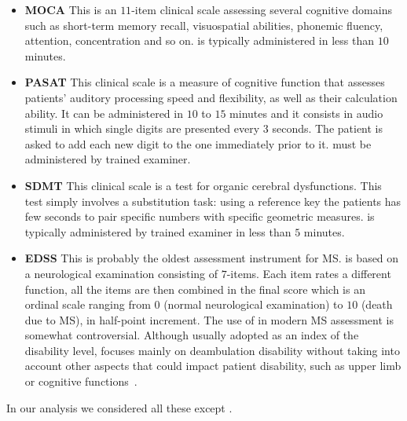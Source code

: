 \begin{itemize}
	\item[] {\sc \textbf{MOCA}} This is an $11$-item clinical scale assessing several cognitive domains such as short-term memory recall, visuospatial abilities, phonemic fluency, attention, concentration and so on. \MOCA is typically administered in less than $10$ minutes.
	
	\item[] {\sc \textbf{PASAT}} This clinical scale is a measure of cognitive function that assesses patients' auditory processing speed and flexibility,  as well as their calculation ability. It can be administered in $10$ to $15$ minutes and it consists in audio stimuli in which single digits are presented every $3$ seconds. The patient is asked to add each new digit to the one immediately prior to it. \PASAT must be administered by trained examiner.
	
	\item[] {\sc \textbf{SDMT}} This clinical scale is a test for organic cerebral dysfunctions. This test simply involves a substitution task: using a reference key the patients has few seconds to pair specific numbers with specific geometric measures.
	\SDMT is typically administered by trained examiner in less than $5$ minutes.
	
	\item[] {\sc \textbf{EDSS}} This is probably the oldest assessment instrument for MS. \EDSS is based on a neurological examination consisting of $7$-items. Each item rates a different function, all the items are then combined in the final \EDSS score which is an ordinal scale ranging from $0$ (normal neurological examination) to $10$ (death due to MS), in half-point increment. The use of \EDSS in modern MS assessment is somewhat controversial. Although usually adopted as an index of the disability level, \EDSS focuses mainly on deambulation disability without taking into account other aspects that could impact patient disability, such as upper limb or cognitive functions~\cite{meyer2014systematic, uitdehaag2014clinical}.
	
	
\end{itemize}

In our analysis we considered all these \PCOs except \EDSS.


